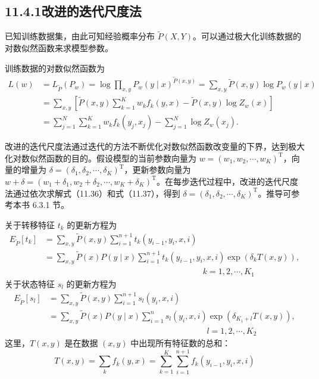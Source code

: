 \documentclass[UTF8,12pt,a4paper,fontset=fandol]{ctexart}
\begin{document}
\subsection*{11.4.1\quad 改进的迭代尺度法}

已知训练数据集，由此可知经验概率分布 $\tilde P(X,Y)$。可以通过极大化训练数据的对数似然函数来求模型参数。

训练数据的对数似然函数为
\[
\begin{aligned}
L(w)&=L_{\tilde P}(P_w)=\log\prod_{x,y}P_w(y\mid x)^{\tilde P(x,y)}
=\sum_{x,y}\tilde P(x,y)\log P_w(y\mid x)\\
&=\sum_{x,y}\left[\tilde P(x,y)\sum_{k=1}^{K}w_k f_k(y,x)-\tilde P(x,y)\log Z_w(x)\right]\\
&=\sum_{j=1}^{N}\sum_{k=1}^{K}w_k f_k(y_j,x_j)-\sum_{j=1}^{N}\log Z_w(x_j).
\end{aligned}
\]

改进的迭代尺度法通过迭代的方法不断优化对数似然函数改变量的下界，达到极大化对数似然函数的目的。假设模型的当前参数向量为 $w=(w_1,w_2,\cdots,w_K)^{\mathrm T}$，向量的增量为 $\delta=(\delta_1,\delta_2,\cdots,\delta_K)^{\mathrm T}$，更新参数向量为 $w+\delta=(w_1+\delta_1,w_2+\delta_2,\cdots,w_K+\delta_K)^{\mathrm T}$。在每步迭代过程中，改进的迭代尺度法通过依次求解式（11.36）和式（11.37），得到 $\delta=(\delta_1,\delta_2,\cdots,\delta_K)^{\mathrm T}$。推导可参考本书 6.3.1 节。

关于转移特征 $t_k$ 的更新方程为
\begin{equation}
\begin{aligned}
E_{\tilde P}[t_k]
&=\sum_{x,y}\tilde P(x,y)\sum_{i=1}^{n+1}t_k(y_{i-1},y_i,x,i)\\
&=\sum_{x,y}\tilde P(x)P(y\mid x)\sum_{i=1}^{n+1}t_k(y_{i-1},y_i,x,i)\exp(\delta_k T(x,y)),\\
&\hspace{8cm} k=1,2,\cdots,K_1
\end{aligned}
\tag{11.36}
\end{equation}
关于状态特征 $s_l$ 的更新方程为
\begin{equation}
\begin{aligned}
E_{\tilde P}[s_l]
&=\sum_{x,y}\tilde P(x,y)\sum_{i=1}^{n+1}s_l(y_i,x,i)\\
&=\sum_{x,y}\tilde P(x)P(y\mid x)\sum_{i=1}^{n}s_l(y_i,x,i)\exp(\delta_{K_1+l}T(x,y)),\\
&\hspace{8cm} l=1,2,\cdots,K_2
\end{aligned}
\tag{11.37}
\end{equation}
这里，$T(x,y)$ 是在数据 $(x,y)$ 中出现所有特征数的总和：
\begin{equation}
T(x,y)=\sum_k f_k(y,x)=\sum_{k=1}^{K}\sum_{i=1}^{n+1}f_k(y_{i-1},y_i,x,i)
\tag{11.38}
\end{equation}
\end{document}
